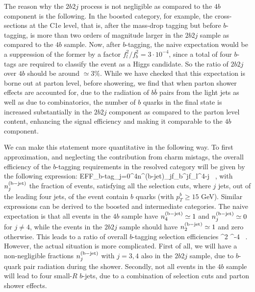 The reason why the  $2b2j$ process
is not negligible as compared to the $4b$ component
is the following.
%
In the boosted category, for example,
the cross-sections at the C1e
level, that is, after the mass-drop tagging but before
$b$-tagging, is more than two orders
of magnitude larger in the $2b2j$
sample as compared to the $4b$ sample.
%
Now, after $b$-tagging, the naive expectation would
be a suppression of the former by a factor $f_l^2/f_b^2 =3\cdot 10^{-4}$,
since a total of four $b$-tags are required to classify the
event as a Higgs candidate.
%
So the ratio of $2b2j$ over $4b$ should be
around $\simeq 3\%$.
While  we have checked that this expectation is borne
out at parton level, before showering,
we find that  when parton shower effects
are accounted for, due to the radiation of $b\bar{b}$ pairs from the
light jets as well as due to combinatorics, the
number of  $b$ quarks in the  final state is
increased substantially in the $2b2j$ component as compared
to the parton level content,
enhancing the signal efficiency and making
it comparable to the $4b$ component.


We can make this statement more quantitative in the following way.
%
To first approximation, and neglecting the contribution from charm mistags, the
overall efficiency of the $b$-tagging requirements in the resolved category will be
given by the following expression:
\be
\label{btaggingeff}
{\rm EFF}_{\rm b-tag}\simeq \sum_{j=0}^{4}n^{\rm (b-jet)}_j\cdot f_b^{j}\cdot f_l^{4-j} \, ,
\ee
with $n^{\rm (b-jet)}_j$ the fraction of events, satisfying all the selection cuts,
where $j$ jets, out of the leading four jets, of the event contain $b$ quarks (with $p_T^b\ge 15$
GeV).
%
Similar expressions can be derived to the boosted and intermediate categories.
%
The naive expectation is that all events in the $4b$ sample have $n^{\rm (b-jet)}_4\simeq 1$
and $n^{\rm (b-jet)}_j\simeq 0$ for $j\ne 4$, while the events in the $2b2j$ sample
should have $n^{\rm (b-jet)}_2\simeq 1$ and zero otherwise.
%
This leads to a ratio of overall $b$-tagging selection efficiencies
\be
\label{eq:naive}
  \simeq
 \lp {}\rp^2 ^{-4} \, .
\ee
However, the actual situation is more complicated.
%
First of all, we will have a non-negligible fractions $n^{\rm (b-jet)}_j$
with $j=3,4$ also in the $2b2j$ sample, due to $b$-quark pair radiation
during the shower.
%
Secondly, not all events in the $4b$ sample will lead to four small-$R$ $b$-jets,
due to a combination of selection cuts and
parton shower effects.
%

